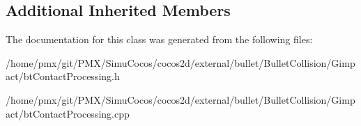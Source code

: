 \subsection*{Additional Inherited Members}


The documentation for this class was generated from the following files\+:\begin{DoxyCompactItemize}
\item 
/home/pmx/git/\+P\+M\+X/\+Simu\+Cocos/cocos2d/external/bullet/\+Bullet\+Collision/\+Gimpact/bt\+Contact\+Processing.\+h\item 
/home/pmx/git/\+P\+M\+X/\+Simu\+Cocos/cocos2d/external/bullet/\+Bullet\+Collision/\+Gimpact/bt\+Contact\+Processing.\+cpp\end{DoxyCompactItemize}
